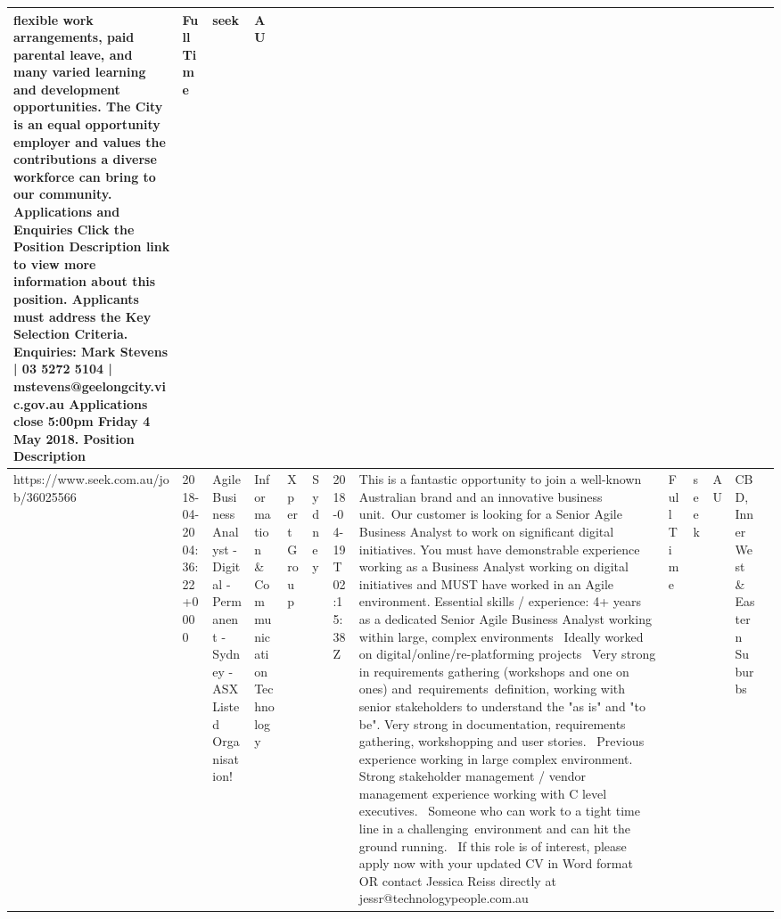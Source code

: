 \documentclass[11pt,a4paper,]{article}
\begin{document}
\begin{table}
\begin{tabular}[t]{l|l|l|l|l|l|l|l|l|l|l|l|l}
flexible work arrangements, paid parental leave, and many varied learning and development opportunities. The City is an equal opportunity employer and values the contributions a diverse workforce can bring to our community. Applications and Enquiries Click the Position Description link to view more information about this position. Applicants must address the Key Selection Criteria. Enquiries: Mark Stevens | 03 5272 5104 | mstevens@geelongcity.vic.gov.au Applications close 5:00pm Friday 4 May 2018. Position Description & Full Time & seek & AU &  & \\
\hline
https://www.seek.com.au/job/36025566 & 2018-04-20 04:36:22 +0000 & Agile Business Analyst - Digital - Permanent - Sydney - ASX Listed Organisation! & Information \& Communication Technology & Xpert Group & Sydney & 2018-04-19T02:15:38Z & This is a fantastic opportunity to join a well-known Australian brand and an innovative business unit. Our customer is looking for a Senior Agile Business Analyst to work on significant digital initiatives. You must have demonstrable experience working as a Business Analyst working on digital initiatives and MUST have worked in an Agile environment. Essential skills / experience: 4+ years as a dedicated Senior Agile Business Analyst working within large, complex environments  Ideally worked on digital/online/re-platforming projects  Very strong in requirements gathering (workshops and one on ones) and requirements definition, working with senior stakeholders to understand the "as is" and "to be". Very strong in documentation, requirements gathering, workshopping and user stories.  Previous experience working in large complex environment.  Strong stakeholder management / vendor management experience working with C level executives.  Someone who can work to a tight time line in a challenging environment and can hit the ground running.  If this role is of interest, please apply now with your updated CV in Word format OR contact Jessica Reiss directly at jessr@technologypeople.com.au & Full Time & seek & AU & CBD, Inner West \& Eastern Suburbs & \\
\hline

\end{tabular}
\end{table}
\end{document}
